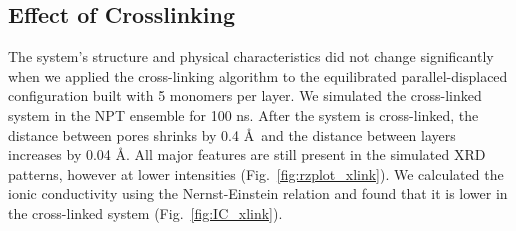 \documentclass{article}
\begin{document}
  \subsection{Effect of Crosslinking}\label{section:xlink}

  The system's structure and physical characteristics did not change
  significantly when we applied the cross-linking algorithm to the equilibrated
  parallel-displaced configuration built with 5 monomers per layer. We simulated
  the cross-linked system in the NPT ensemble for 100 ns. After the system is
  cross-linked, the distance between pores shrinks by 0.4 \AA~and the distance
  between layers increases by 0.04 \AA. All major features are still present in
  the simulated XRD patterns, however at lower intensities
  (Fig.~\ref{fig:rzplot_xlink}). We calculated the ionic conductivity using the
  Nernst-Einstein relation and found that it is lower in the cross-linked system
  (Fig.~\ref{fig:IC_xlink}).
\end{document}
